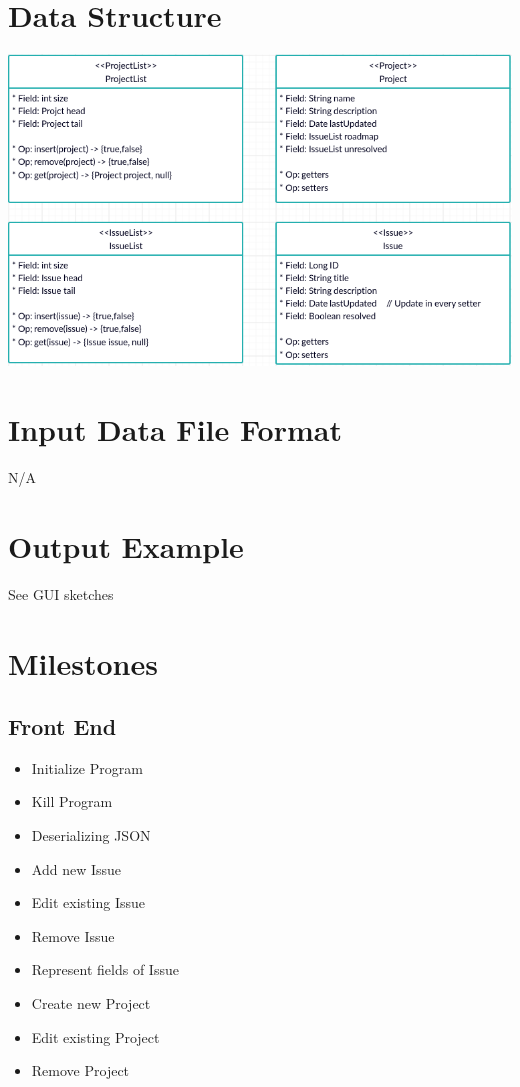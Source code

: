 \documentclass{article}
\begin{document}
\section{Data Structure}

    \includegraphics[scale=.6]{IssueTracker_UML.png}

\section{Input Data File Format}

    N/A

\section{Output Example}

    See GUI sketches

\section{Milestones}

    \subsection{Front End}

        \begin{itemize}
            \item Initialize Program
            \item Kill Program
            \item Deserializing JSON
            \item Add new Issue
            \item Edit existing Issue
            \item Remove Issue
            \item Represent fields of Issue
            \item Create new Project
            \item Edit existing Project
            \item Remove Project
        \end{itemize}
\end{document}

